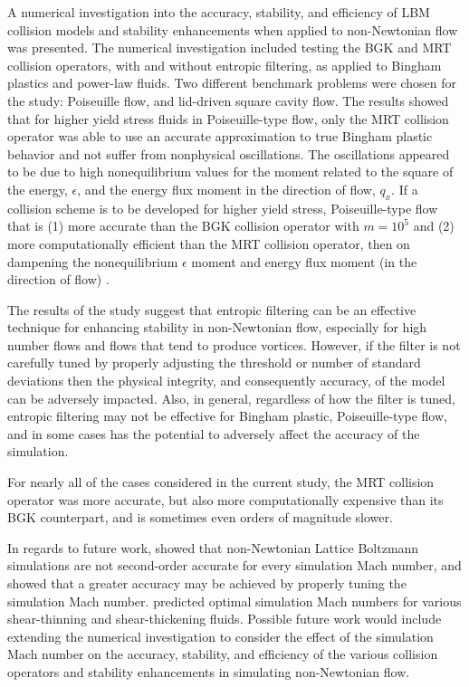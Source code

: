 A numerical investigation into the accuracy, stability, and efficiency of LBM collision models and stability enhancements when applied to non-Newtonian flow was presented.
The numerical investigation included testing the BGK and MRT collision operators, with and without entropic filtering, as applied to Bingham plastics and power-law fluids.
Two different benchmark problems were chosen for the study: Poiseuille flow, and lid-driven square cavity flow.
The results showed that for higher yield stress fluids in Poiseuille-type flow, only the MRT collision operator was able to use an accurate approximation to true Bingham plastic behavior and not suffer from nonphysical oscillations.
The oscillations appeared to be due to high nonequilibrium values for the moment related to the square of the energy, $\epsilon$, and the energy flux moment in the direction of flow, $q_x$.
If a collision scheme is to be developed for higher yield stress, Poiseuille-type flow that is (1) more accurate than the BGK collision operator with $m = 10^5$ and (2) more computationally efficient than the MRT collision operator, then \DIFdelbegin {}\DIFdelend \DIFaddbegin {}\DIFaddend on dampening the nonequilibrium $\epsilon$ moment and energy flux moment (in the direction of flow) \DIFaddbegin {}\DIFaddend .

The results of the study suggest that entropic filtering can be an effective technique for enhancing stability in non-Newtonian flow, especially for high \DIFdelbegin {}\DIFdelend \DIFaddbegin {}\DIFaddend number flows and flows that tend to produce vortices.
However, if the filter is not carefully tuned by properly adjusting the threshold or number of standard deviations then the physical integrity, and consequently accuracy, of the model can be adversely impacted.
Also, in general, regardless of how the filter is tuned, entropic filtering may not be effective for Bingham plastic, Poiseuille-type flow, and in some cases has the potential to adversely affect the accuracy of the simulation.

For nearly all of the cases considered in the current study, the MRT collision operator was more accurate, but also more computationally expensive than its BGK counterpart, and is sometimes even orders of magnitude slower.

In regards to future work, \cite{conrad2015accuracy} showed that non-Newtonian Lattice Boltzmann simulations are not second-order accurate for every simulation Mach number, and showed that a greater accuracy may be achieved by properly tuning the simulation Mach number.
\cite{conrad2015accuracy} predicted optimal simulation Mach numbers for various shear-thinning and shear-thickening fluids. 
Possible future work would include extending the numerical investigation to consider the effect of the simulation Mach number on the accuracy, stability, and efficiency of the various collision operators and stability enhancements in simulating non-Newtonian flow.
\DIFdelbegin %

